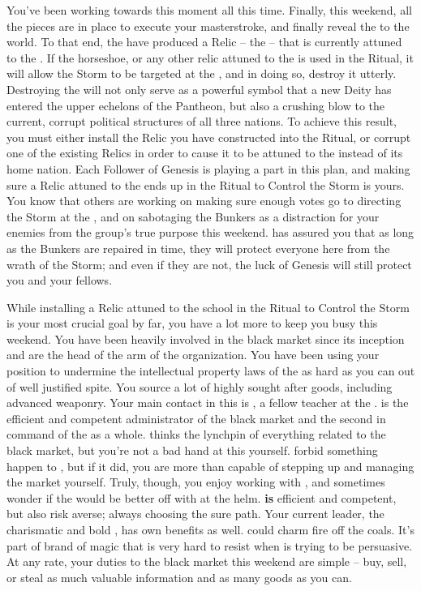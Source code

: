 \documentclass[char]{GL2020}
\begin{document}
You've been working towards this moment all this time. Finally, this weekend, all the pieces are in place to execute your masterstroke, and finally reveal the \pGoaties{} to the world. To that end, the \pGoaties{} have produced a Relic – the \iHorseshoe{} – that is currently attuned to the \pSchool{}. If the horseshoe, or any other relic attuned to the \pSc{} is used in the Ritual, it will allow the Storm to be targeted at the \pSchool{}, and in doing so, destroy it utterly. Destroying the \pSc{} will not only serve as a powerful symbol that a new Deity has entered the upper echelons of the Pantheon, but also a crushing blow to the current, corrupt political structures of all three nations. To achieve this result, you must either install the Relic you have constructed into the Ritual, or corrupt one of the existing Relics in order to cause it to be attuned to the \pSc{} instead of its home nation. Each Follower of Genesis is playing a part in this plan, and making sure a Relic attuned to the \pSc{} ends up in the Ritual to Control the Storm is yours. You know that others are working on making sure enough votes go to directing the Storm at the \pSc{}, and on sabotaging the Bunkers as a distraction for your enemies from the group's true purpose this weekend. \cChupLeader{} has assured you that as long as the Bunkers are repaired in time, they will protect everyone here from the wrath of the Storm; and even if they are not, the luck of Genesis will still protect you and your fellows.

While installing a Relic attuned to the school in the Ritual to Control the Storm is your most crucial goal by far, you have a lot more to keep you busy this weekend. You have been heavily involved in the black market since its inception and are the head of the \pTech{} arm of the organization. You have been using your position to undermine the intellectual property laws of the \pTech{} as hard as you can out of well justified spite. You source a lot of highly sought after goods, including advanced weaponry. Your main contact in this is \cChupSecond{\full}, a fellow teacher at the \pSc{}. \cChupSecond{} is the efficient and competent administrator of the black market and the second in command of the \pGoaties{} as a whole. \cChupSecond{} thinks \cChupSecond{\theyare} the lynchpin of everything related to the black market, but you're not a bad hand at this yourself. \cGenesis{} forbid something happen to \cChupSecond{}, but if it did, you are more than capable of stepping up and managing the market yourself. Truly, though, you enjoy working with \cChupSecond{}, and sometimes wonder if the \pGoaties{} would be better off with \cChupSecond{} at the helm. \cChupSecond{} \textbf{is} efficient and competent, but \cChupSecond{\theyare} also risk averse; always choosing the sure path. Your current leader, the charismatic and bold \cChupLeader{}, has \cChupLeader{\their} own benefits as well. \cChupLeader{} could charm fire off the coals. It's part of \cChupLeader{\their} brand of magic that \cChupLeader{\they} is very hard to resist when \cChupLeader{\they} is trying to be persuasive. At any rate, your duties to the black market this weekend are simple -- buy, sell, or steal as much valuable information and as many goods as you can. 
\end{document}
